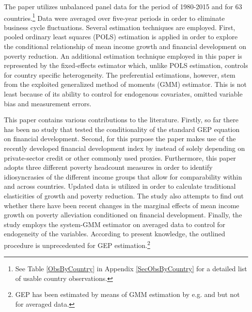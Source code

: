 \documentclass[12pt, a4paper]{article}
\begin{document}
The paper utilizes unbalanced panel data for the period of 1980-2015 and for 63 countries.\footnote{See Table \ref{ObsByCountry} in Appendix \ref{SecObsByCountry} for a detailed list of usable country observations.} Data were averaged over five-year periods in order to eliminate business cycle fluctuations. Several estimation techniques are employed. First, pooled ordinary least squares (POLS) estimation is applied in order to explore the conditional relationship of mean income growth and financial development on poverty reduction. An additional estimation technique employed in this paper is represented by the fixed-effects estimator which, unlike POLS estimation, controls for country specific heterogeneity. The preferential estimations, however, stem from the exploited generalized method of moments (GMM) estimator. This is not least because of its ability to control for endogenous covariates, omitted variable bias and measurement errors.

This paper contains various contributions to the literature. Firstly, so far there has been no study that tested the conditionality of the standard GEP equation on financial development. Second, for this purpose the paper makes use of the recently developed financial development index by  instead of solely depending on private-sector credit or other commonly used proxies. Furthermore, this paper adopts three different poverty headcount measures in order to identify idiosyncrasies of the different income groups that allow for comparability within and across countries. Updated data is utilized in order to calculate traditional elasticities of growth and poverty reduction. The study also attempts to find out whether there have been recent changes in the marginal effects of mean income growth on poverty alleviation conditioned on financial development. Finally, the study employs the system-GMM estimator on averaged data to control for endogeneity of the variables. According to present knowledge, the outlined procedure is unprecedented for GEP estimation.\footnote{GEP has been estimated by means of GMM estimation by e.g.  and  but not for averaged data.}
\end{document}
